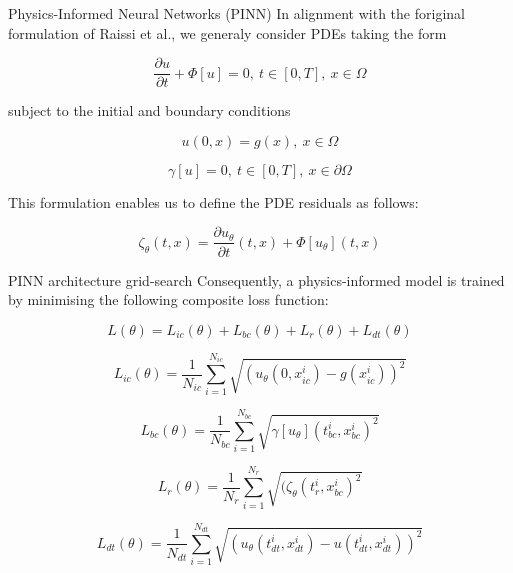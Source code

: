 \documentclass[serif,8pt, aspectratio=169]{beamer}
\begin{document}
\begin{frame}[fragile]{Physics-Informed Neural Networks (PINN)}
    In alignment with the foriginal formulation of Raissi et al., we generaly consider PDEs taking the form
    
    \begin{equation}
        \frac{\partial u}{\partial t} + \Phi[u] = 0,~t\in [0,T],~x \in \Omega
    \end{equation}
    
    subject to the initial and boundary conditions
    
    \begin{equation}
        u(0,x)=g(x),~x\in\Omega 
    \end{equation}
    
    \begin{equation}
        \gamma [u]=0,~t\in[0,T],~x\in\partial\Omega
    \end{equation}

    This formulation enables us to define the PDE residuals as follows:

    \begin{equation}
        \zeta_\theta (t,x) = \frac{\partial u_\theta}{\partial t}(t,x) + \Phi[u_\theta](t,x)
    \end{equation}

    
\end{frame}

\begin{frame}[fragile]{PINN architecture grid-search}
    Consequently, a physics-informed model is trained by minimising the following composite loss function:
    
    \begin{equation}
       \textit{L}(\theta ) = \textit{L}_{ic}(\theta )+\textit{L}_{bc}(\theta )+\textit{L}_{r}(\theta )+\textit{L}_{dt}(\theta )
    \end{equation}
    
    \begin{equation}
        \textit{L}_{ic}(\theta )=\frac{1}{N_{ic}}\sum^{N_{ic}}_{i=1}\sqrt{(u_\theta(0,x_{ic}^i)-g(x_{ic}^i))^2}
    \end{equation}

    \begin{equation}
        \textit{L}_{bc}(\theta )=\frac{1}{N_{bc}}\sum^{N_{bc}}_{i=1}\sqrt{\gamma[u_\theta](t^{i}_{bc},x^i_{bc})^2}
    \end{equation}

    \begin{equation}
        \textit{L}_{r}(\theta )=\frac{1}{N_{r}}\sum^{N_{r}}_{i=1}\sqrt{(\zeta_\theta(t^i_{r},x^i_{bc})^2}
    \end{equation}

    \begin{equation}
        \textit{L}_{dt}(\theta )=\frac{1}{N_{dt}}\sum^{N_{dt}}_{i=1}\sqrt{(u_\theta(t^i_{dt},x_{dt}^i)-u(t^i_{dt},x_{dt}^i))^2}
    \end{equation}

\end{frame}
\end{document}
